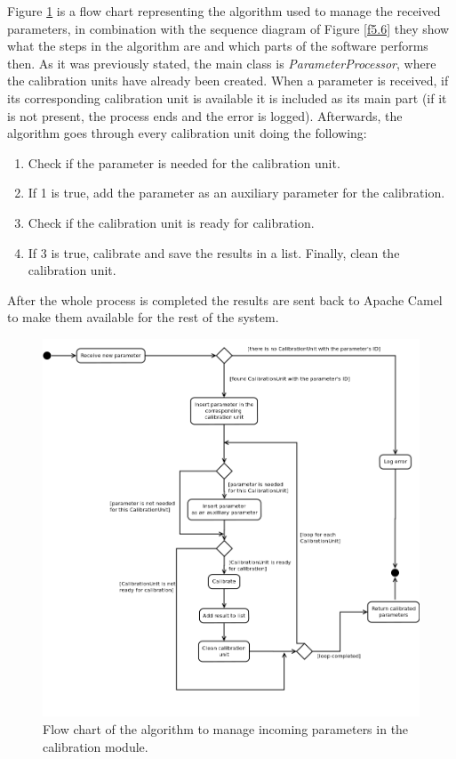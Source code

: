 Figure \ref{f5.5} is a flow chart representing the algorithm used to manage the received parameters, in combination with the sequence diagram of Figure \ref{f5.6} they show what the steps in the algorithm are and which parts of the software performs then. As it was previously stated, the main class is \emph{ParameterProcessor}, where the calibration units have already been created. When a parameter is received, if its corresponding calibration unit is available it is included as its main part (if it is not present, the process ends and the error is logged). Afterwards, the algorithm goes through every calibration unit doing the following:
\begin{enumerate}
\item Check if the parameter is needed for the calibration unit.
\item If 1 is true, add the parameter as an auxiliary parameter for the calibration.
\item Check if the calibration unit is ready for calibration.
\item If 3 is true, calibrate and save the results in a list. Finally, clean the calibration unit.
\end{enumerate}

After the whole process is completed the results are sent back to Apache Camel to make them available for the rest of the system.

\begin{figure}[H]
\centerline{\includegraphics[width=1\textwidth]{images/ReceiveParameterAndCalibrateFlowChart.png}}
\caption{Flow chart of the algorithm to manage incoming parameters in the calibration module.}
\label{f5.5}
\end{figure}


